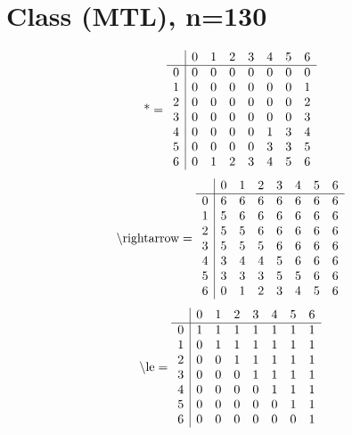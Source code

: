\documentclass[11pt]{article}
\begin{document}
\section{Class (MTL), n=130}
\[\text{*} = 
\begin{array}{r | r r r r r r r}
 & 0 & 1 & 2 & 3 & 4 & 5 & 6 \\ \hline
0 & 0 & 0 & 0 & 0 & 0 & 0 & 0 \\
1 & 0 & 0 & 0 & 0 & 0 & 0 & 1 \\
2 & 0 & 0 & 0 & 0 & 0 & 0 & 2 \\
3 & 0 & 0 & 0 & 0 & 0 & 0 & 3 \\
4 & 0 & 0 & 0 & 0 & 1 & 3 & 4 \\
5 & 0 & 0 & 0 & 0 & 3 & 3 & 5 \\
6 & 0 & 1 & 2 & 3 & 4 & 5 & 6 \\
\end{array}
\]
\[\text{\textbackslash rightarrow} = 
\begin{array}{r | r r r r r r r}
 & 0 & 1 & 2 & 3 & 4 & 5 & 6 \\ \hline
0 & 6 & 6 & 6 & 6 & 6 & 6 & 6 \\
1 & 5 & 6 & 6 & 6 & 6 & 6 & 6 \\
2 & 5 & 5 & 6 & 6 & 6 & 6 & 6 \\
3 & 5 & 5 & 5 & 6 & 6 & 6 & 6 \\
4 & 3 & 4 & 4 & 5 & 6 & 6 & 6 \\
5 & 3 & 3 & 3 & 5 & 5 & 6 & 6 \\
6 & 0 & 1 & 2 & 3 & 4 & 5 & 6 \\
\end{array}
\]
\[\text{\textbackslash le} = 
\begin{array}{r | r r r r r r r}
 & 0 & 1 & 2 & 3 & 4 & 5 & 6 \\ \hline
0 & 1 & 1 & 1 & 1 & 1 & 1 & 1 \\
1 & 0 & 1 & 1 & 1 & 1 & 1 & 1 \\
2 & 0 & 0 & 1 & 1 & 1 & 1 & 1 \\
3 & 0 & 0 & 0 & 1 & 1 & 1 & 1 \\
4 & 0 & 0 & 0 & 0 & 1 & 1 & 1 \\
5 & 0 & 0 & 0 & 0 & 0 & 1 & 1 \\
6 & 0 & 0 & 0 & 0 & 0 & 0 & 1 \\
\end{array}
\]
\end{document}
